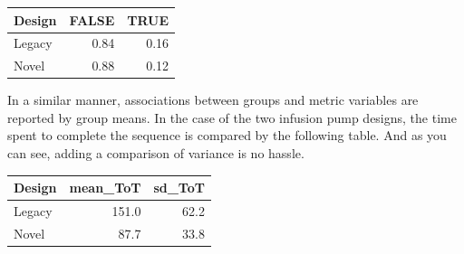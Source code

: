 \documentclass[]{svmono}
\newenvironment{Shaded}{\begin{snugshade}}{\end{snugshade}}
\newcommand{\KeywordTok}[1]{\textcolor[rgb]{0.13,0.29,0.53}{\textbf{#1}}}
\newcommand{\DataTypeTok}[1]{\textcolor[rgb]{0.13,0.29,0.53}{#1}}
\newcommand{\DecValTok}[1]{\textcolor[rgb]{0.00,0.00,0.81}{#1}}
\newcommand{\StringTok}[1]{\textcolor[rgb]{0.31,0.60,0.02}{#1}}
\newcommand{\OperatorTok}[1]{\textcolor[rgb]{0.81,0.36,0.00}{\textbf{#1}}}
\newcommand{\NormalTok}[1]{#1}
\theoremstyle{definition}
\theoremstyle{definition}
\theoremstyle{definition}
\theoremstyle{remark}
\begin{document}
\begin{Shaded}
\end{Shaded}

\begin{tabular}{l|r|r}
\hline
Design & FALSE & TRUE\\
\hline
Legacy & 0.84 & 0.16\\
\hline
Novel & 0.88 & 0.12\\
\hline
\end{tabular}

In a similar manner, associations between groups and metric variables
are reported by group means. In the case of the two infusion pump
designs, the time spent to complete the sequence is compared by the
following table. And as you can see, adding a comparison of variance is
no hassle.

\begin{Shaded}
\end{Shaded}

\begin{tabular}{l|r|r}
\hline
Design & mean\_ToT & sd\_ToT\\
\hline
Legacy & 151.0 & 62.2\\
\hline
Novel & 87.7 & 33.8\\
\hline
\end{tabular}
\end{document}
